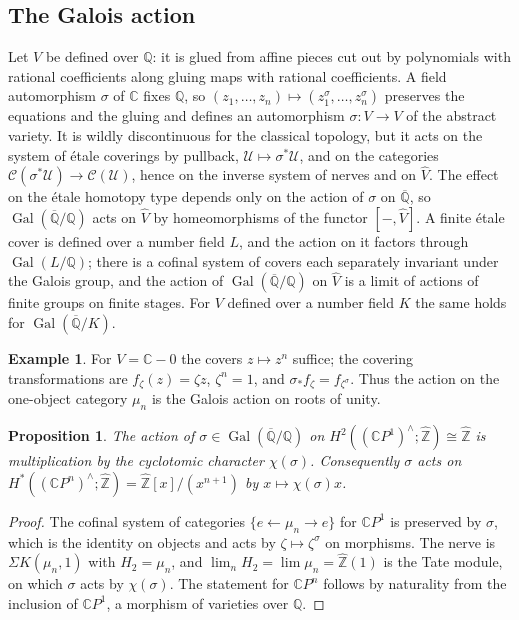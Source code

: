 \documentclass[11pt]{amsart}
\theoremstyle{plain}
\newtheorem{proposition}[theorem]{Proposition}
\theoremstyle{definition}
\newtheorem{example}[theorem]{Example}
\numberwithin{equation}{section}
\newcommand{\Q}{\mathbb{Q}}
\newcommand{\C}{\mathbb{C}}
\newcommand{\Zhat}{\widehat{\mathbb{Z}}}
\newcommand{\Qbar}{\overline{\mathbb{Q}}}
\newcommand{\CP}{\mathbb{C}P}
\DeclareMathOperator{\Gal}{Gal}
\begin{document}
\subsection{The Galois action}
Let $V$ be defined over $\Q$: it is glued from affine pieces cut out by polynomials with rational coefficients along gluing maps with rational coefficients.
A field automorphism $\sigma$ of $\C$ fixes $\Q$, so $(z_1,\dots,z_n)\mapsto(z_1^\sigma,\dots,z_n^\sigma)$ preserves the equations and the gluing and defines an automorphism $\sigma\colon V\to V$ of the abstract variety.
It is wildly discontinuous for the classical topology, but it acts on the system of \'etale coverings by pullback, $\mathcal U\mapsto\sigma^*\mathcal U$, and on the categories $\mathcal C(\sigma^*\mathcal U)\to\mathcal C(\mathcal U)$, hence on the inverse system of nerves and on $\widehat V$.
The effect on the \'etale homotopy type depends only on the action of $\sigma$ on $\Qbar$, so $\Gal(\Qbar/\Q)$ acts on $\widehat V$ by homeomorphisms of the functor $[-,\widehat V]$.
A finite \'etale cover is defined over a number field $L$, and the action on it factors through $\Gal(L/\Q)$; there is a cofinal system of covers each separately invariant under the Galois group, and the action of $\Gal(\Qbar/\Q)$ on $\widehat V$ is a limit of actions of finite groups on finite stages.
For $V$ defined over a number field $K$ the same holds for $\Gal(\Qbar/K)$.

\begin{example}
For $V=\C-0$ the covers $z\mapsto z^n$ suffice; the covering transformations are $f_\zeta(z)=\zeta z$, $\zeta^n=1$, and $\sigma_*f_\zeta=f_{\zeta^\sigma}$.
Thus the action on the one-object category $\mu_n$ is the Galois action on roots of unity.
\end{example}

\begin{proposition}\label{prop:galoisP1}
The action of $\sigma\in\Gal(\Qbar/\Q)$ on $H^2((\CP^1)^\wedge;\Zhat)\cong\Zhat$ is multiplication by the cyclotomic character $\chi(\sigma)$.
Consequently $\sigma$ acts on $H^*((\CP^n)^\wedge;\Zhat)=\Zhat[x]/(x^{n+1})$ by $x\mapsto\chi(\sigma)x$.
\end{proposition}

\begin{proof}
The cofinal system of categories $\{e\leftarrow\mu_n\rightarrow e\}$ for $\CP^1$ is preserved by $\sigma$, which is the identity on objects and acts by $\zeta\mapsto\zeta^\sigma$ on morphisms.
The nerve is $\Sigma K(\mu_n,1)$ with $H_2=\mu_n$, and $\lim_nH_2=\lim\mu_n=\Zhat(1)$ is the Tate module, on which $\sigma$ acts by $\chi(\sigma)$.
The statement for $\CP^n$ follows by naturality from the inclusion of $\CP^1$, a morphism of varieties over $\Q$.
\end{proof}
\end{document}
